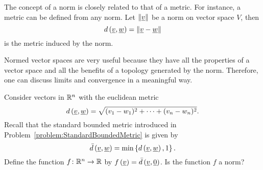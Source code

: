 The concept of a norm is closely related to that of a metric.
For instance, a metric can be defined from any norm.
Let $\left\| \underline{v} \right\|$ be a norm on vector space $V$, then
\begin{equation*}
d \left( \underline{v}, \underline{w} \right)
= \left\| \underline{v} - \underline{w} \right\|
\end{equation*}
is the metric induced by the norm.

Normed vector spaces are very useful because they have all the properties of a vector space and all the benefits of a topology generated by the norm.
Therefore, one can discuss limits and convergence in a meaningful way.

\begin{example}
Consider vectors in $\mathbb{R}^n$ with the euclidean metric
\begin{equation*}
d \left( \underline{v}, \underline{w} \right)
= \sqrt{ (v_1 - w_1)^2 + \cdots + (v_n - w_n)^2 }.
\end{equation*}
Recall that the standard bounded metric introduced in Problem~\ref{problem:StandardBoundedMetric} is given by
\begin{equation*}
\bar{d} \left( \underline{v}, \underline{w} \right)
= \min \left\{ d \left( \underline{v}, \underline{w} \right), 1 \right\}.
\end{equation*}
Define the function $f \colon \mathbb{R}^n \rightarrow \mathbb{R}$ by
$f \left( \underline{v} \right) = \bar{d} \left( \underline{v}, \underline{0} \right)$.
Is the function $f$ a norm?

\begin{table}[p]
\end{table}
\end{example}
